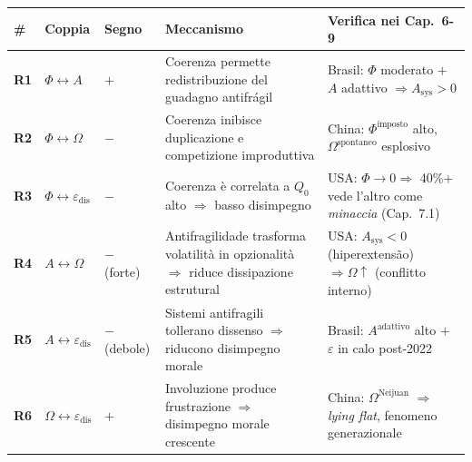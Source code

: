 {\def\LTcaptype{none} %
{\small\begin{longtable}[]{@{}
  >{\raggedright\arraybackslash}p{}
  >{\raggedright\arraybackslash}p{}
  >{\raggedright\arraybackslash}p{}
  >{\raggedright\arraybackslash}p{}
  >{\raggedright\arraybackslash}p{}@{}}
\toprule\noalign{}
\begin{minipage}[b]{\linewidth}\raggedright
\#
\end{minipage} & \begin{minipage}[b]{\linewidth}\raggedright
Coppia
\end{minipage} & \begin{minipage}[b]{\linewidth}\raggedright
Segno
\end{minipage} & \begin{minipage}[b]{\linewidth}\raggedright
Meccanismo
\end{minipage} & \begin{minipage}[b]{\linewidth}\raggedright
Verifica nei Cap.~6-9
\end{minipage} \\
\midrule\noalign{}
\endhead
\bottomrule\noalign{}
\endlastfoot
\textbf{R1} & \(\Phi \leftrightarrow A\) & \(+\) & Coerenza permette
redistribuzione del guadagno antifrágil & Brasil: \(\Phi\) moderato
\(+\) \(A\) adattivo \(\Rightarrow A_{\text{sys}} > 0\) \\
\textbf{R2} & \(\Phi \leftrightarrow \Omega\) & \(-\) & Coerenza
inibisce duplicazione e competizione improduttiva & China:
\(\Phi^{\text{imposto}}\) alto, \(\Omega^{\text{spontaneo}}\)
esplosivo \\
\textbf{R3} & \(\Phi \leftrightarrow \varepsilon_{\text{dis}}\) & \(-\)
& Coerenza è correlata a \(Q_0\) alto \(\Rightarrow\) basso disimpegno &
USA: \(\Phi \to 0 \Rightarrow\) 40\%+ vede l'altro come \emph{minaccia}
(Cap.~7.1) \\
\textbf{R4} & \(A \leftrightarrow \Omega\) & \(-\) (forte) &
Antifragilidade trasforma volatilità in opzionalità \(\Rightarrow\) riduce
dissipazione estrutural & USA: \(A_{\text{sys}} < 0\) (hiperextensão)
\(\Rightarrow \Omega \uparrow\) (conflitto interno) \\
\textbf{R5} & \(A \leftrightarrow \varepsilon_{\text{dis}}\) & \(-\)
(debole) & Sistemi antifragili tollerano dissenso \(\Rightarrow\)
riducono disimpegno morale & Brasil: \(A^{\text{adattivo}}\) alto \(+\)
\(\varepsilon\) in calo post-2022 \\
\textbf{R6} & \(\Omega \leftrightarrow \varepsilon_{\text{dis}}\) &
\(+\) & Involuzione produce frustrazione \(\Rightarrow\) disimpegno
morale crescente & China: \(\Omega^{\text{Neijuan}}\) \(\Rightarrow\)
\emph{lying flat}, fenomeno generazionale \\
\end{longtable}}
}

